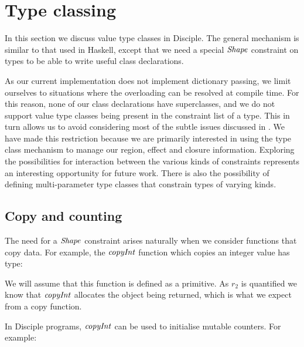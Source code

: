 
\clearpage{}
\section{Type classing}
\label{System:TypeClassing}
In this section we discuss value type classes in Disciple. The general mechanism is similar to that used in Haskell, except that we need a special $\operatorname{\mathit{Shape}}$ constraint on types to be able to write useful class declarations.

As our current implementation does not implement dictionary passing, we limit ourselves to situations where the overloading can be resolved at compile time. For this reason, none of our class declarations have superclasses, and we do not support value type classes being present in the constraint list of a type. This in turn allows us to avoid considering most of the subtle issues discussed in \cite{peyton-jones:type-class-design-space}. We have made this restriction because we are primarily interested in using the type class mechanism to manage our region, effect and closure information. Exploring the possibilities for interaction between the various kinds of constraints represents an interesting opportunity for future work. There is also the possibility of defining multi-parameter type classes that constrain types of varying kinds. 


\subsection{Copy and counting}
The need for a $\operatorname{\mathit{Shape}}$ constraint arises naturally when we consider functions that copy data. For example, the  $\operatorname{\mathit{copyInt}}$ function which copies an integer value has type:


We will assume that this function is defined as a primitive. As $r_2$ is quantified we know that $\operatorname{\mathit{copyInt}}$ allocates the object being returned, which is what we expect from a copy function.

In Disciple programs, $\operatorname{\mathit{copyInt}}$ can be used to initialise mutable counters. For example:



